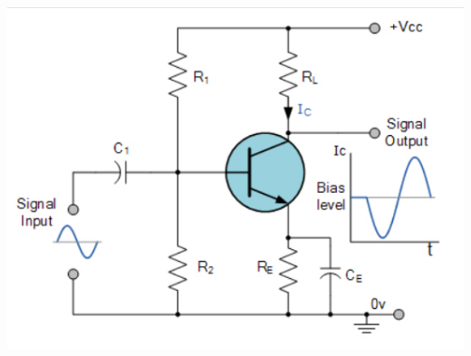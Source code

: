 \documentclass[10pt,a4paper]{article}
\begin{document}
\begin{center}
\includegraphics[scale=0.4]{img2.png} 
\end{center}
\end{document}

